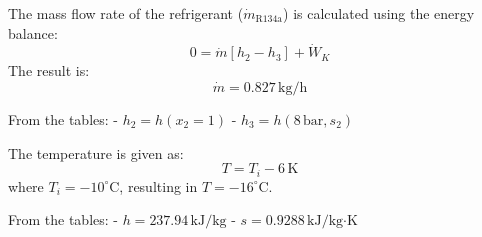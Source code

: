 The mass flow rate of the refrigerant (\( \dot{m}_{\text{R134a}} \)) is calculated using the energy balance:  
\[
0 = \dot{m} \left[ h_2 - h_3 \right] + \dot{W}_K
\]  
The result is:  
\[
\dot{m} = 0.827 \, \text{kg/h}
\]  

From the tables:  
- \( h_2 = h(x_2 = 1) \)  
- \( h_3 = h(8 \, \text{bar}, s_2) \)  

The temperature is given as:  
\[
T = T_i - 6 \, \text{K}
\]  
where \( T_i = -10^\circ\text{C} \), resulting in \( T = -16^\circ\text{C} \).  

From the tables:  
- \( h = 237.94 \, \text{kJ/kg} \)  
- \( s = 0.9288 \, \text{kJ/kg·K} \)